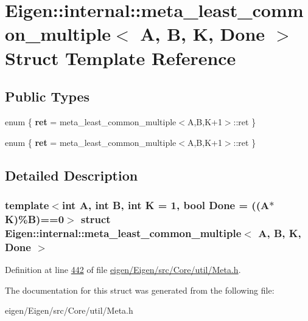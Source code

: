\hypertarget{struct_eigen_1_1internal_1_1meta__least__common__multiple}{}\section{Eigen\+:\+:internal\+:\+:meta\+\_\+least\+\_\+common\+\_\+multiple$<$ A, B, K, Done $>$ Struct Template Reference}
\label{struct_eigen_1_1internal_1_1meta__least__common__multiple}
\subsection*{Public Types}
\begin{DoxyCompactItemize}
\item 
\mbox{\label{struct_eigen_1_1internal_1_1meta__least__common__multiple_a7f5c391a7176b8942d85a6b860194fb1}} 
enum \{ {\bfseries ret} = meta\+\_\+least\+\_\+common\+\_\+multiple$<$A,B,K+1$>$\+:\+:ret
 \}
\item 
\mbox{\label{struct_eigen_1_1internal_1_1meta__least__common__multiple_a62c7113d3da52bf7a60d308e3761fae8}} 
enum \{ {\bfseries ret} = meta\+\_\+least\+\_\+common\+\_\+multiple$<$A,B,K+1$>$\+:\+:ret
 \}
\end{DoxyCompactItemize}


\subsection{Detailed Description}
\subsubsection*{template$<$int A, int B, int K = 1, bool Done = ((\+A$\ast$\+K)\%\+B)==0$>$\newline
struct Eigen\+::internal\+::meta\+\_\+least\+\_\+common\+\_\+multiple$<$ A, B, K, Done $>$}



Definition at line \hyperlink{eigen_2_eigen_2src_2_core_2util_2_meta_8h_source_l00442}{442} of file \hyperlink{eigen_2_eigen_2src_2_core_2util_2_meta_8h_source}{eigen/\+Eigen/src/\+Core/util/\+Meta.\+h}.



The documentation for this struct was generated from the following file\+:\begin{DoxyCompactItemize}
\item 
eigen/\+Eigen/src/\+Core/util/\+Meta.\+h\end{DoxyCompactItemize}

